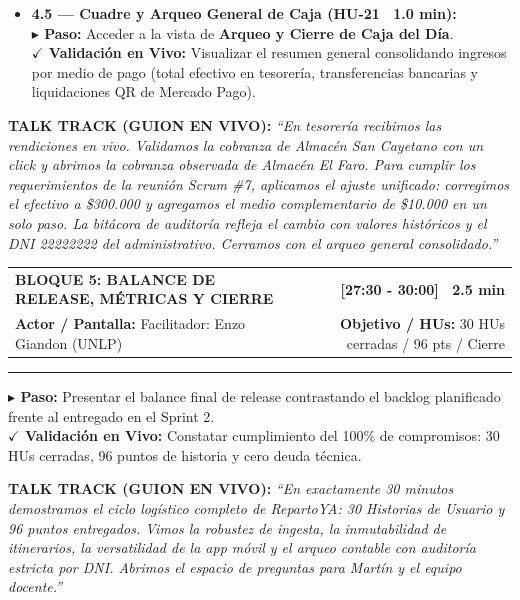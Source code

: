 \documentclass[a4paper,9pt]{article}
\makeatletter
\newcommand{\stepact}[1]{\textbf{$\blacktriangleright$ Paso:} #1}
\newcommand{\valact}[1]{\textbf{$\checkmark$ Validación en Vivo:} #1}
\newcommand{\blockheader}[4]{%
  \begin{tabularx}{\textwidth}{@{}X r@{}}
    {\fontsize{10.5pt}{12.5pt}\selectfont\textbf{#1}} & {\normalsize\textbf{#2}} \\
    {\footnotesize\textbf{Actor / Pantalla:} #3} & {\footnotesize\textbf{Objetivo / HUs:} #4}
  \end{tabularx}%
  \vspace{-2pt}\hrule\vspace{3.5pt}%
}
\makeatother
\begin{document}
\begin{tcolorbox}[cardframe, top=3pt, bottom=3pt, left=6pt, right=6pt]
{\begin{itemize}[leftmargin=11pt, itemsep=4pt]
\item \textbf{4.5 — Cuadre y Arqueo General de Caja (HU-21 \textbar\ 1.0 min):} \\
\stepact{Acceder a la vista de \textbf{Arqueo y Cierre de Caja del Día}.} \\
\valact{Visualizar el resumen general consolidando ingresos por medio de pago (total efectivo en tesorería, transferencias bancarias y liquidaciones QR de Mercado Pago).}

\end{itemize}
}

\vspace{1pt}
\begin{tcolorbox}[talktrackcard]
{\scriptsize\textbf{TALK TRACK (GUION EN VIVO):}} {\scriptsize\itshape
``En tesorería recibimos las rendiciones en vivo. Validamos la cobranza de Almacén San Cayetano con un click y abrimos la cobranza observada de Almacén El Faro. Para cumplir los requerimientos de la reunión Scrum \#7, aplicamos el ajuste unificado: corregimos el efectivo a \$300.000 y agregamos el medio complementario de \$10.000 en un solo paso. La bitácora de auditoría refleja el cambio con valores históricos y el DNI 22222222 del administrativo. Cerramos con el arqueo general consolidado.''}
\end{tcolorbox}
\end{tcolorbox}

\vspace{-4pt}

\begin{tcolorbox}[cardframe, top=2.5pt, bottom=2.5pt]
\blockheader{BLOQUE 5: BALANCE DE RELEASE, MÉTRICAS Y CIERRE}{[27:30 - 30:00] \textbar\ 2.5 min}{Facilitador: Enzo Giandon (UNLP)}{30 HUs cerradas / 96 pts / Cierre}
{\footnotesize
\stepact{Presentar el balance final de release contrastando el backlog planificado frente al entregado en el Sprint 2.} \\
\valact{Constatar cumplimiento del 100\% de compromisos: 30 HUs cerradas, 96 puntos de historia y cero deuda técnica.}
}
\vspace{-2pt}
\begin{tcolorbox}[talktrackcard]
{\scriptsize\textbf{TALK TRACK (GUION EN VIVO):}} {\scriptsize\itshape ``En exactamente 30 minutos demostramos el ciclo logístico completo de RepartoYA: 30 Historias de Usuario y 96 puntos entregados. Vimos la robustez de ingesta, la inmutabilidad de itinerarios, la versatilidad de la app móvil y el arqueo contable con auditoría estricta por DNI. Abrimos el espacio de preguntas para Martín y el equipo docente.''}
\end{tcolorbox}
\end{tcolorbox}
\end{document}

